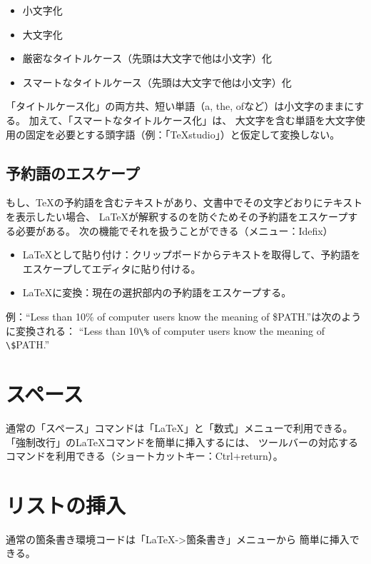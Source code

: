 \begin{itemize}
\item
  小文字化
\item
  大文字化
\item
  厳密なタイトルケース（先頭は大文字で他は小文字）化
\item
  スマートなタイトルケース（先頭は大文字で他は小文字）化
\end{itemize}

「タイトルケース化」の両方共、短い単語（a, the, ofなど）は小文字のままにする。
加えて、「スマートなタイトルケース化」は、
大文字を含む単語を大文字使用の固定を必要とする頭字語（例：「TeXstudio」）と仮定して変換しない。

\subsection{予約語のエスケープ}

もし、TeXの予約語を含むテキストがあり、文書中でその文字どおりにテキストを表示したい場合、
LaTeXが解釈するのを防ぐためその予約語をエスケープする必要がある。
次の機能でそれを扱うことができる（メニュー：Idefix）

\begin{itemize}
    \item
      LaTeXとして貼り付け：クリップボードからテキストを取得して、予約語をエスケープしてエディタに貼り付ける。
    \item
      LaTeXに変換：現在の選択部内の予約語をエスケープする。
\end{itemize}

例：``Less than 10\% of computer users know the meaning of \$PATH.''は次のように変換される：
``Less than 10\verb+\%+ of computer users know the meaning of \verb+\$+PATH.''

\section{スペース}

通常の「スペース」コマンドは「LaTeX」と「数式」メニューで利用できる。
「強制改行」のLaTeXコマンドを簡単に挿入するには、
ツールバーの対応するコマンドを利用できる（ショートカットキー：Ctrl+return）。

\section{リストの挿入}

通常の箇条書き環境コードは「LaTeX-\textgreater{}箇条書き」メニューから
簡単に挿入できる。

